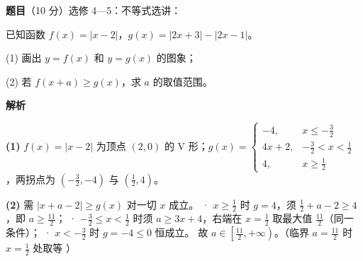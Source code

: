 \begin{answer}

\textbf{题目}（10 分）选修 4—5：不等式选讲：

已知函数 $f(x)=|x-2|$，$g(x)=|2x+3|-|2x-1|$。
\nopagebreak[4]
\begin{center}\end{center}
\nopagebreak[4]
  (1) 画出 $y=f(x)$ 和 $y=g(x)$ 的图象；

  (2) 若 $f(x+a)\geqslant g(x)$，求 $a$ 的取值范围。

\textbf{解析}

\begin{gktip}
\textbf{(1)} $f(x)=|x-2|$ 为顶点 $(2,0)$ 的 V 形；$g(x)=\begin{cases}-4,&x\leqslant-\tfrac32\\ 4x+2,&-\tfrac32<x<\tfrac12\\ 4,&x\geqslant\tfrac12\end{cases}$，两拐点为 $\left(-\tfrac32,-4\right)$ 与 $\left(\tfrac12,4\right)$。

\textbf{(2)} 需 $|x+a-2|\geqslant g(x)$ 对一切 $x$ 成立。
· $x\geqslant\tfrac12$ 时 $g=4$，须 $\tfrac12+a-2\geqslant4$，即 $a\geqslant\tfrac{11}2$；
· $-\tfrac32\leqslant x<\tfrac12$ 时须 $a\geqslant3x+4$，右端在 $x=\tfrac12$ 取最大值 $\tfrac{11}2$（同一条件）；
· $x<-\tfrac32$ 时 $g=-4\leqslant0$ 恒成立。
故 $\boxed{a\in\left[\tfrac{11}2,+\infty\right)}$。（临界 $a=\tfrac{11}2$ 时 $x=\tfrac12$ 处取等 ）
\end{gktip}



\end{answer}